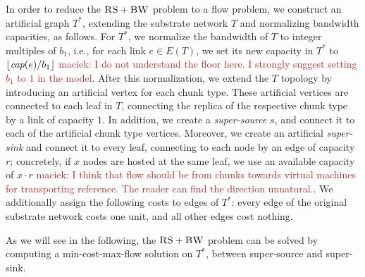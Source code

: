 \documentclass[9pt]{sigcomm-alternate}
\newcommand{\maciek}[1]{\textcolor{brown}{maciek: #1}}
\newcommand{\MaFactor}{r}
\newcommand{\Source}{\ensuremath{s}}
\newcommand{\capacity}{\emph{cap}}
\newcommand{\RS}{\textsc{RS}}
\newcommand{\BW}{\textsc{BW}}
\newcommand{\Tree}{\ensuremath{T}}
\newcommand{\CostTrans}{\ensuremath{b_1}}
\begin{document}
In order to reduce the $\RS+\BW$ problem to a flow problem, we construct
an artificial graph $\Tree^*$, extending the substrate network $\Tree$ and
normalizing bandwidth capacities, as follows. For $\Tree^*$,
we normalize the bandwidth of $\Tree$ to integer multiples of $\CostTrans$,
i.e., for each link $e\in E(\Tree)$, we set its new
capacity in $\Tree^*$ to $\lfloor\capacity(e)/\CostTrans\rfloor$
\maciek{I do not understand the floor here. I strongly suggest setting
$\CostTrans$ to $1$ in the model}. 
After this normalization, we extend the $\Tree$ topology by
introducing an artificial vertex for each chunk type. These artificial
vertices are connected to each leaf in $\Tree$,
connecting the replica of the respective chunk type by a link of capacity $1$. In
addition, we create a
\emph{super-source} $\Source$, and connect it to each of the artificial chunk
type vertices. Moreover, we create an artificial \emph{super-sink} and
connect it to every leaf, connecting to each node by an edge of capacity $\MaFactor$; 
concretely, if $x$ nodes are hosted at the same leaf, we use an available capacity of 
$x \cdot \MaFactor$ \maciek{I think that flow should be from chunks
  towards virtual machines for transporting reference. The reader can
  find the direction unnatural.}.
We additionally assign the following costs to edges of $\Tree^*$:
every edge of the original substrate network costs one unit, and all other edges
cost nothing.

As we will see in the following, the $\RS+\BW$ problem can be solved by computing
a min-cost-max-flow solution on $\Tree^*$, between super-source and super-sink. 
\end{document}
